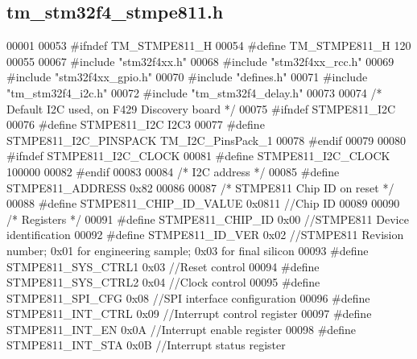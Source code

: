 \hypertarget{tm__stm32f4__stmpe811_8h_source}{}\subsection{tm\+\_\+stm32f4\+\_\+stmpe811.\+h}

\begin{DoxyCode}
00001 
00053 \textcolor{preprocessor}{#ifndef TM\_STMPE811\_H}
00054 \textcolor{preprocessor}{#define TM\_STMPE811\_H   120}
00055 
00067 \textcolor{preprocessor}{#include "stm32f4xx.h"}
00068 \textcolor{preprocessor}{#include "stm32f4xx\_rcc.h"}
00069 \textcolor{preprocessor}{#include "stm32f4xx\_gpio.h"}
00070 \textcolor{preprocessor}{#include "defines.h"}
00071 \textcolor{preprocessor}{#include "tm\_stm32f4\_i2c.h"}
00072 \textcolor{preprocessor}{#include "tm\_stm32f4\_delay.h"}
00073 
00074 \textcolor{comment}{/* Default I2C used, on F429 Discovery board */}
00075 \textcolor{preprocessor}{#ifndef STMPE811\_I2C}
00076 \textcolor{preprocessor}{#define STMPE811\_I2C                    I2C3}
00077 \textcolor{preprocessor}{#define STMPE811\_I2C\_PINSPACK           TM\_I2C\_PinsPack\_1}
00078 \textcolor{preprocessor}{#endif}
00079 
00080 \textcolor{preprocessor}{#ifndef STMPE811\_I2C\_CLOCK}
00081 \textcolor{preprocessor}{#define STMPE811\_I2C\_CLOCK              100000}
00082 \textcolor{preprocessor}{#endif}
00083 
00084 \textcolor{comment}{/* I2C address */}
00085 \textcolor{preprocessor}{#define STMPE811\_ADDRESS                0x82}
00086 
00087 \textcolor{comment}{/* STMPE811 Chip ID on reset */}
00088 \textcolor{preprocessor}{#define STMPE811\_CHIP\_ID\_VALUE          0x0811  //Chip ID}
00089 
00090 \textcolor{comment}{/* Registers */}
00091 \textcolor{preprocessor}{#define STMPE811\_CHIP\_ID                0x00    //STMPE811 Device identification}
00092 \textcolor{preprocessor}{#define STMPE811\_ID\_VER                 0x02    //STMPE811 Revision number; 0x01 for engineering sample;
       0x03 for final silicon}
00093 \textcolor{preprocessor}{#define STMPE811\_SYS\_CTRL1              0x03    //Reset control}
00094 \textcolor{preprocessor}{#define STMPE811\_SYS\_CTRL2              0x04    //Clock control}
00095 \textcolor{preprocessor}{#define STMPE811\_SPI\_CFG                0x08    //SPI interface configuration}
00096 \textcolor{preprocessor}{#define STMPE811\_INT\_CTRL               0x09    //Interrupt control register}
00097 \textcolor{preprocessor}{#define STMPE811\_INT\_EN                 0x0A    //Interrupt enable register}
00098 \textcolor{preprocessor}{#define STMPE811\_INT\_STA                0x0B    //Interrupt status register}

\end{DoxyCode}
